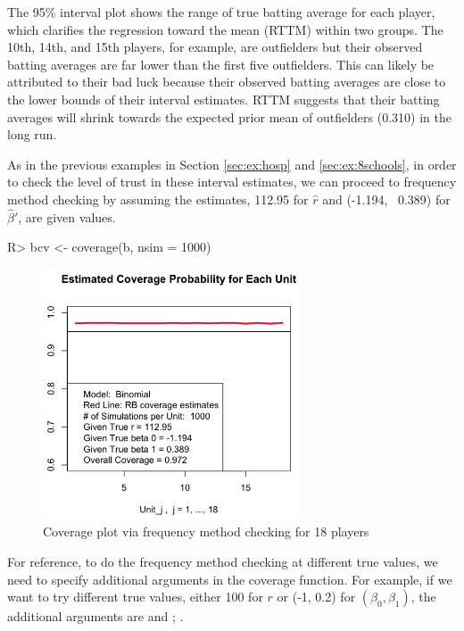 \documentclass[article]{jss}
\begin{document}
The 95\% interval plot shows the range of true batting average for each player, which clarifies the regression toward the mean (RTTM) within two groups. The 10th, 14th, and 15th players, for example, are outfielders but their observed batting averages are far lower than the first five outfielders. This can likely be attributed to their bad luck because their observed batting averages are close to the lower bounds of their interval estimates. RTTM suggests that their batting averages will shrink towards the expected prior mean of outfielders (0.310) in the long run.


As in the previous examples in Section \ref{sec:ex:hosp} and \ref{sec:ex:8schools}, in order to check the level of trust in these interval estimates, we can proceed to frequency method checking by assuming the estimates, 112.95 for $\hat{r}$ and (-1.194, ~0.389) for $\hat{\beta}'$, are given values. 

\begin{CodeChunk}
\begin{CodeInput}
R> bcv <- coverage(b, nsim = 1000) 
\end{CodeInput}
\end{CodeChunk}
\begin{figure}[h]
\begin{center}
\includegraphics[width = 3in]{baseball2.png}
\caption{Coverage plot via frequency method checking for 18 players}
\label{fig:baseball2}
\end{center}
\end{figure}

For reference, to do the frequency method checking at different true values, we need to specify additional arguments in the coverage function. For example, if we want to try different true values, either 100 for $r$ or (-1, 0.2) for $(\beta_{0}, \beta_{1})$, the additional arguments are  and ; .
\end{document}
